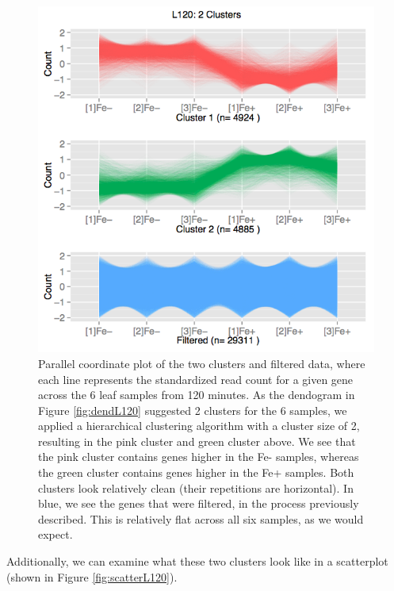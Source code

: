 \documentclass[11pt,a4paper,oldfontcommands,openany]{memoir}
\numberwithin{equation}{section} %
\begin{document}
\begin{figure}[H]
    \begin{framed}
    \centering
    \includegraphics[width=\textwidth]{pcp2L120}
    \end{framed}
    \caption{Parallel coordinate plot of the two clusters and filtered data, where each line represents the standardized read count for a given gene across the 6 leaf samples from 120 minutes. As the dendogram in Figure \ref{fig:dendL120} suggested 2 clusters for the 6 samples, we applied a hierarchical clustering algorithm with a cluster size of 2, resulting in the pink cluster and green cluster above. We see that the pink cluster contains genes higher in the Fe- samples, whereas the green cluster contains genes higher in the Fe+ samples. Both clusters look relatively clean (their repetitions are horizontal). In blue, we see the genes that were filtered, in the process previously described. This is relatively flat across all six samples, as we would expect.}
    \label{fig:pcp2L120}
\end{figure}

Additionally, we can examine what these two clusters look like in a scatterplot (shown in Figure \ref{fig:scatterL120}).
\end{document}

